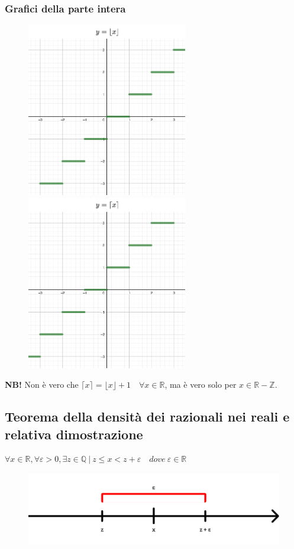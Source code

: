 \documentclass{article}
\begin{document}
\subsubsection{Grafici della parte intera}
\begin{figure}[!h]
    \centering
    \includegraphics[width=7cm]{./images/floor_graph.jpg}\hfill
    \includegraphics[width=7cm]{./images/ceil_graph.jpg}
\end{figure}

\noindent \textbf{NB!} Non è vero che $\lceil x \rceil = \lfloor x \rfloor + 1 \quad \forall x \in \mathbb{R}$, ma è vero solo per $x \in \mathbb{R} - \mathbb{Z}$.

\subsection{Teorema della densità dei razionali nei reali e relativa dimostrazione}
\begin{center}
    $\forall x \in \mathbb{R}, \forall \varepsilon > 0, \exists z \in \mathbb{Q} \ | \ z \leq x < z + \varepsilon \quad dove \ \varepsilon \in \mathbb{R}$
    \begin{figure}[!h]
    \centering
    \includegraphics[width=15cm]{./images/densityQinR.pdf}
\end{figure}
\end{center}
\end{document}
